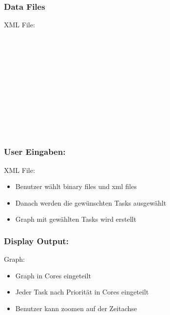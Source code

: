 \documentclass{beamer}
\begin{document}
\begin{frame}
	\frametitle{Data Files}
	\begin{block}{XML File:}
			\\
			\\
			\\
			\\
			\\
			\\
			\\
			\\
			\\
			\\
			\\	
			\\			
	\end{block}
\end{frame}

\begin{frame}
	\frametitle{User Eingaben:}
	\begin{block}{XML File:}
		\begin{itemize}
			\item Benutzer wählt binary files und xml files
			\item Danach werden die gewünschten Tasks ausgewählt
			\item Graph mit gewählten Tasks wird erstellt
		\end{itemize}	
	\end{block}
\end{frame}

\begin{frame}
	\frametitle{Display Output:}
	\begin{block}{Graph:}
		\begin{itemize}
			\item Graph in Cores eingeteilt
			\item Jeder Task nach Priorität in Cores eingeteilt
			\item Benutzer kann zoomen auf der Zeitachse
		\end{itemize}	
	\end{block}
\end{frame}
\end{document}

